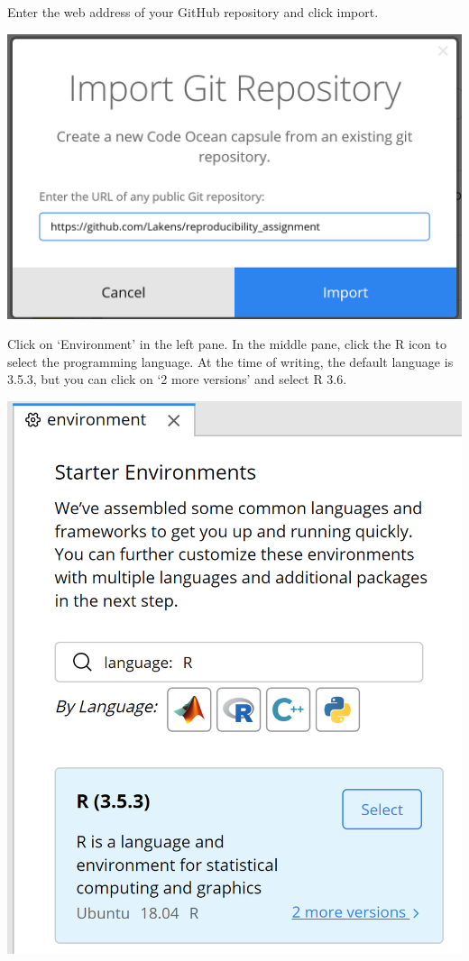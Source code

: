 \documentclass[
  oneside]{krantz}
\begin{document}
Enter the web address of your GitHub repository and click import.

\begin{center}\includegraphics[width=1\linewidth]{images/51f0dab67e96b317ef54a0affabe14d6} \end{center}

Click on `Environment' in the left pane. In the middle pane, click the R icon to
select the programming language. At the time of writing, the default language is
3.5.3, but you can click on `2 more versions' and select R 3.6.

\begin{center}\includegraphics[width=1\linewidth]{images/d6a90fd36fce0555b797e269cdd8c992} \end{center}
\end{document}
